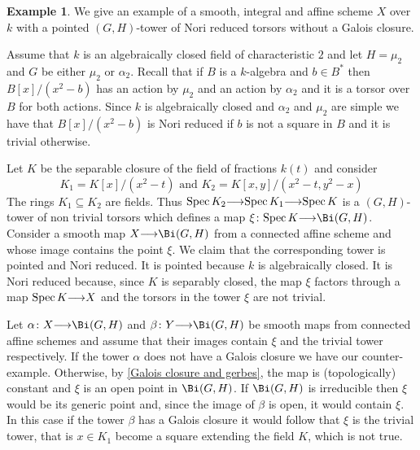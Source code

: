\documentclass[12pt,reqno]{amsart}
\theoremstyle{plain}
\theoremstyle{definition}
\newtheorem{ex}[thm]{Example}
\numberwithin{thm}{section}
\newcounter{x}\setcounter{x}{1}
\theoremstyle{plain}
\begin{document}
\begin{ex}\label{counterexample 2}
  We give an example of a smooth, integral and affine scheme $X$ over $k$ with a pointed $(G,H)$-tower of Nori reduced torsors without a Galois closure.
  
  Assume that $k$ is an algebraically closed field of characteristic $2$ and let $H=\mu_2$ and $G$ be either $\mu_2$ or $\alpha_2$. Recall that if $B$ is a $k$-algebra and $b\in B^*$ then $B[x]/(x^2-b)$ has an action by $\mu_2$ and an action by $\alpha_2$ and it is a torsor over $B$ for both actions. Since $k$ is algebraically closed and $\alpha_2$ and $\mu_2$ are simple we have that $B[x]/(x^2-b)$ is Nori reduced if $b$ is not a square in $B$ and it is trivial otherwise.
  
  Let $K$ be the separable closure of the field of fractions $k(t)$ and consider 
  \[
  K_1=K[x]/(x^2-t) \text{ and } K_2=K[x,y]/(x^2-t,y^2-x)
  \]
  The rings $K_1\subseteq K_2$ are fields. Thus ${{\rm Spec \,}} K_2{\longrightarrow} {{\rm Spec \,}} K_1 {\longrightarrow} {{\rm Spec \,}} K$ is a $(G,H)$-tower of non trivial torsors which defines a map $\xi\colon {{\rm Spec \,}} K{\longrightarrow} \Bi(G,H)$.
  Consider a smooth map $X{\longrightarrow} \Bi(G,H)$ from a connected affine scheme and whose image contains the point $\xi$. We claim that the corresponding tower is pointed and Nori reduced. It is pointed because $k$ is algebraically closed. It is Nori reduced because, since $K$ is separably closed, the map $\xi$ factors through a map ${{\rm Spec \,}} K{\longrightarrow} X$ and the torsors in the tower $\xi$ are not trivial.
  
  Let $\alpha\colon X{\longrightarrow} \Bi(G,H)$ and $\beta\colon Y{\longrightarrow} \Bi(G,H)$ be smooth maps from connected affine schemes and assume that their images contain $\xi$ and the trivial tower respectively. If the tower $\alpha$ does not have a Galois closure we have our counter-example. Otherwise, by \ref{Galois closure and gerbes}, the map is (topologically) constant and $\xi$ is an open point in $\Bi(G,H)$. If $\Bi(G,H)$ is irreducible then $\xi$ would be its generic point and, since the image of $\beta$ is open, it would contain $\xi$. In this case if the tower $\beta$ has a Galois closure it would follow that $\xi$ is the trivial tower, that is $x\in K_1$ become a square extending the field $K$, which is not true.  
  

\end{ex}
\end{document}
